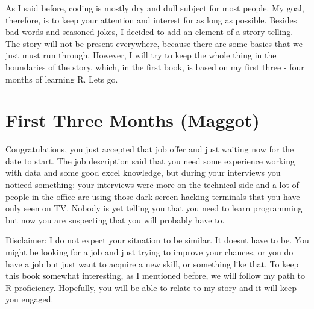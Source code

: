 \documentclass[]{book}
\begin{document}
As I said before, coding is mostly dry and dull subject for most people. My goal, therefore, is to keep your attention and interest for as long as possible. Besides bad words and seasoned jokes, I decided to add an element of a strory telling. The story will not be present everywhere, because there are some basics that we just must run through. However, I will try to keep the whole thing in the boundaries of the story, which, in the first book, is based on my first three - four months of learning R. Lets go.

\hypertarget{first-three-months-maggot}{%
\chapter{First Three Months (Maggot)}\label{first-three-months-maggot}}

Congratulations, you just accepted that job offer and just waiting now for the date to start. The job description said that you need some experience working with data and some good excel knowledge, but during your interviews you noticed something: your interviews were more on the technical side and a lot of people in the office are using those dark screen hacking terminals that you have only seen on TV. Nobody is yet telling you that you need to learn programming but now you are suspecting that you will probably have to.

Disclaimer: I do not expect your situation to be similar. It doesnt have to be. You might be looking for a job and just trying to improve your chances, or you do have a job but just want to acquire a new skill, or something like that. To keep this book somewhat interesting, as I mentioned before, we will follow my path to R proficiency. Hopefully, you will be able to relate to my story and it will keep you engaged.
\end{document}

